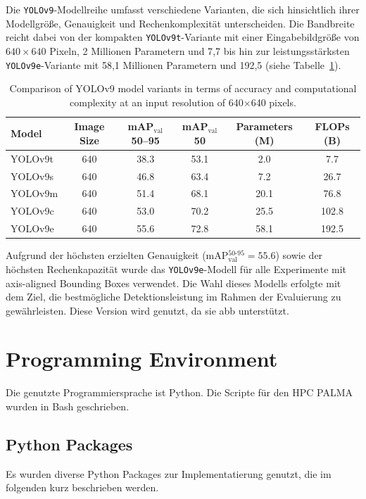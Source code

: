 Die \texttt{YOLOv9}-Modellreihe umfasst verschiedene Varianten, die sich hinsichtlich ihrer Modellgröße, Genauigkeit und Rechenkomplexität unterscheiden. Die Bandbreite reicht dabei von der kompakten \texttt{YOLOv9t}-Variante mit einer Eingabebildgröße von $640 \times 640$ Pixeln, 2 Millionen Parametern und 7{,}7  bis hin zur leistungsstärksten \texttt{YOLOv9e}-Variante mit 58{,}1 Millionen Parametern und 192{,}5  (siehe Tabelle~\ref{tab:yolov9-models}). 
\begin{table}[h]
\centering
\begin{tabular}{l|c|c|c|c|c} %
\textbf{Model} & \textbf{Image Size} & \textbf{mAP$_{\text{val}}$ 50--95} & \textbf{mAP$_{\text{val}}$ 50} & \textbf{Parameters (M)} & \textbf{FLOPs (B)} \\
\hline
YOLOv9t & 640 & 38.3 & 53.1 & 2.0 & 7.7 \\
YOLOv9s & 640 & 46.8 & 63.4 & 7.2 & 26.7 \\
YOLOv9m & 640 & 51.4 & 68.1 & 20.1 & 76.8 \\
YOLOv9c & 640 & 53.0 & 70.2 & 25.5 & 102.8 \\
YOLOv9e & 640 & 55.6 & 72.8 & 58.1 & 192.5 \\
\end{tabular}
\caption{Comparison of YOLOv9 model variants in terms of accuracy and computational complexity at an input resolution of 640$\times$640 pixels.}
\label{tab:yolov9-models}
\end{table}



Aufgrund der höchsten erzielten Genauigkeit (\acrshort{mAP}$_{\text{val}}^{50\text{-}95} = 55.6$) sowie der höchsten Rechenkapazität wurde das \texttt{YOLOv9e}-Modell für alle Experimente mit axis-aligned Bounding Boxes verwendet. Die Wahl dieses Modells erfolgte mit dem Ziel, die bestmögliche Detektionsleistung im Rahmen der Evaluierung zu gewährleisten. Diese Version wird genutzt, da sie \acrlong{abb} unterstützt.

\section{Programming Environment}
Die genutzte Programmiersprache ist Python. Die Scripte für den \acrshort{HPC} \acrshort{PALMA} wurden in Bash geschrieben.

\subsection{Python Packages}
Es wurden diverse Python Packages zur Implementatierung genutzt, die im folgenden kurz beschrieben werden. 
